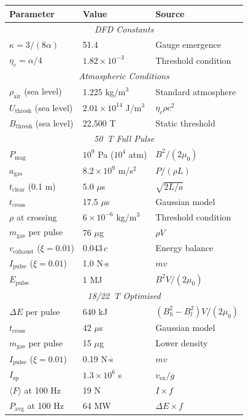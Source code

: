 \documentclass[amsmath,amssymb,aps,prd,superscriptaddress,nofootinbib]{revtex4-2}
\newcommand{\ka}{\kappa}
\newcommand{\etac}{\eta_c}
\begin{document}
\begin{center}
\begin{tabular}{lll}
\toprule
\textbf{Parameter} & \textbf{Value} & \textbf{Source} \\
\midrule
\multicolumn{3}{c}{\textit{DFD Constants}} \\
$\ka = 3/(8\alpha)$ & 51.4 & Gauge emergence \\
$\etac = \alpha/4$ & $1.82 \times 10^{-3}$ & Threshold condition \\
\midrule
\multicolumn{3}{c}{\textit{Atmospheric Conditions}} \\
$\rho_\text{air}$ (sea level) & 1.225 kg/m$^3$ & Standard atmosphere \\
$U_\text{thresh}$ (sea level) & $2.01 \times 10^{14}$ J/m$^3$ & $\etac \rho c^2$ \\
$B_\text{thresh}$ (sea level) & 22{,}500 T & Static threshold \\
\midrule
\multicolumn{3}{c}{\textit{50~T Full Pulse}} \\
$P_\text{mag}$ & $10^9$ Pa ($10^4$ atm) & $B^2/(2\mu_0)$ \\
$a_\text{gas}$ & $8.2 \times 10^9$ m/s$^2$ & $P/(\rho L)$ \\
$t_\text{clear}$ (0.1 m) & 5.0 $\mu$s & $\sqrt{2L/a}$ \\
$t_\text{cross}$ & 17.5 $\mu$s & Gaussian model \\
$\rho$ at crossing & $6 \times 10^{-6}$ kg/m$^3$ & Threshold condition \\
$m_\text{gas}$ per pulse & 76 $\mu$g & $\rho V$ \\
$v_\text{exhaust}$ ($\xi = 0.01$) & $0.043\,c$ & Energy balance \\
$I_\text{pulse}$ ($\xi = 0.01$) & 1.0 N$\cdot$s & $mv$ \\
$E_\text{pulse}$ & 1 MJ & $B^2V/(2\mu_0)$ \\
\midrule
\multicolumn{3}{c}{\textit{18/22~T Optimised}} \\
$\Delta E$ per pulse & 640 kJ & $(B_h^2 - B_l^2)V/(2\mu_0)$ \\
$t_\text{cross}$ & 42 $\mu$s & Gaussian model \\
$m_\text{gas}$ per pulse & 15 $\mu$g & Lower density \\
$I_\text{pulse}$ ($\xi = 0.01$) & 0.19 N$\cdot$s & $mv$ \\
$I_\text{sp}$ & $1.3 \times 10^6$ s & $v_\text{ex}/g$ \\
$\langle F \rangle$ at 100 Hz & 19 N & $I \times f$ \\
$P_\text{avg}$ at 100 Hz & 64 MW & $\Delta E \times f$ \\
\bottomrule
\end{tabular}
\end{center}
\end{document}

